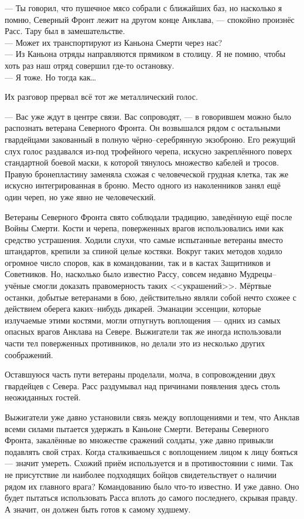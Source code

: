 \noindent --- Ты говорил, что пушечное мясо собрали с ближайших баз, но 
насколько я помню, Северный Фронт лежит на другом конце Анклава, --- спокойно 
произнёс Расс. Тару был в замешательстве.\\
--- Может их транспортируют из Каньона Смерти через нас?\\
--- Из Каньона отряды направляются прямиком в столицу. Я не помню, чтобы хоть 
раз наш отряд совершил где-то остановку.\\
--- Я тоже. Но тогда как\ldots

Их разговор прервал всё тот же металлический голос.

\noindent --- Вас уже ждут в центре связи. Вас сопроводят, --- в говорившем 
можно было распознать ветерана Северного Фронта. Он возвышался рядом с 
остальными гвардейцами закованный в полную чёрно--серебрянную экзоброню. Его 
режущий слух голос раздавался из-под трофейного черепа, искусно закреплённого 
поверх стандартной боевой маски, к которой тянулось множество кабелей и тросов. 
Правую бронепластину заменяла схожая с человеческой грудная клетка, так же 
искусно интегрированная в броню. Место одного из наколенников занял ещё один 
череп, но уже явно не человеческий.

Ветераны Северного Фронта свято соблюдали традицию, заведённую ещё после Войны 
Смерти. Кости и черепа, поверженных врагов использовались ими как средство 
устрашения. Ходили слухи, что самые испытанные ветераны вместо штандартов, 
крепили за спиной целые костяки. Вокруг таких методов ходило огромное число 
споров, как в командовании, так и в кастах Защитников и Советников. Но, 
насколько было известно Рассу, совсем недавно Мудрецы--учёные смогли доказать 
правомерность таких <<украшений>>. Мёртвые останки, добытые ветеранами в бою, 
действительно являли собой нечто схожее с действием оберега каких--нибудь 
дикарей. Эманации эссенции, которые излучаемые этими костями, могли отпугнуть 
воплощения --- одних из самых опасных врагов Анклава на Севере. Выжигатели так 
же иногда использовали части тел поверженных противников, но делали это из 
несколько других соображений.

Оставшуюся часть пути ветераны проделали, молча, в сопровождении двух 
гвардейцев с Севера. Расс раздумывал над причинами появления здесь столь 
неожиданных гостей.

Выжигатели уже давно установили связь между воплощениями и тем, что Анклав 
всеми силами пытается удержать в Каньоне Смерти. Ветераны Северного Фронта, 
закалённые во множестве сражений солдаты, уже давно привыкли подавлять свой 
страх. Когда сталкиваешься с воплощением лицом к лицу бояться --- значит 
умереть. Схожий приём используется и в противостоянии с ними. Так не присутствие 
ли наиболее подходящих бойцов свидетельствует о наличии рядом их главного 
врага? Командованию было что-то известно. И уже давно. Оно будет пытаться 
использовать Расса вплоть до самого последнего, скрывая правду. А значит, он 
должен быть готов к самому худшему.

